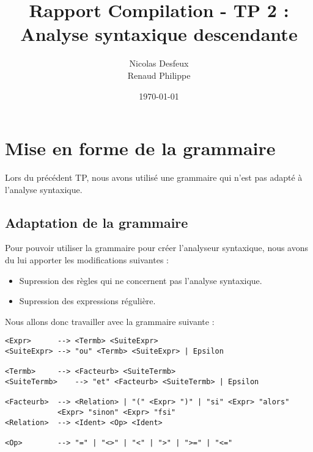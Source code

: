 \documentclass[11pt]{article} %
\date{\today}
\title{Rapport Compilation - TP 2 : \\Analyse syntaxique descendante}
\author{Nicolas Desfeux\\Renaud Philippe}
\begin{document}
\lstset{language=Caml,breaklines=true,numbers=left}
\maketitle
\tableofcontents
\section{Mise en forme de la grammaire}
Lors du pr\'ec\'edent TP, nous avons utilis\'e une grammaire qui n'est pas adapt\'e à l'analyse syntaxique.
\subsection{Adaptation de la grammaire}
Pour pouvoir utiliser la grammaire pour cr\'eer l'analyseur syntaxique, nous avons du lui apporter les modifications suivantes : 
\begin{itemize}
	\item Supression des r\`egles qui ne concernent pas l'analyse syntaxique.
	\item Supression des expressions r\'eguli\`ere.
\end{itemize}
	Nous allons donc travailler avec la grammaire suivante : 
\begin{lstlisting}
<Expr>		--> <Termb> <SuiteExpr>
<SuiteExpr>	--> "ou" <Termb> <SuiteExpr> | Epsilon

<Termb>		--> <Facteurb> <SuiteTermb>
<SuiteTermb>	--> "et" <Facteurb> <SuiteTermb> | Epsilon

<Facteurb>	--> <Relation> | "(" <Expr> ")" | "si" <Expr> "alors"
			<Expr> "sinon" <Expr> "fsi"
<Relation>	--> <Ident> <Op> <Ident>

<Op>		--> "=" | "<>" | "<" | ">" | ">=" | "<="
\end{lstlisting} 
\end{document}
